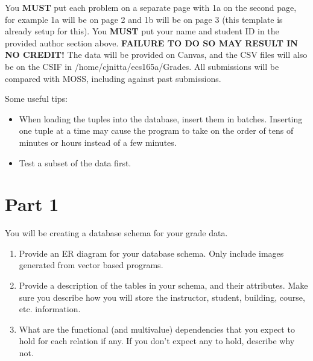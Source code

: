 \documentclass{article}
\begin{document}
You {\bf MUST} put each problem on a separate page with 1a on the second page, for example 1a will be on page 2 and 1b will be on page 3 (this template is already setup for this).
You {\bf MUST} put your name and student ID in the provided author section above. {\bf FAILURE TO DO SO MAY RESULT IN NO CREDIT!}
The data will be provided on Canvas, and the CSV files will also be on the CSIF in /home/cjnitta/ecs165a/Grades. All submissions will be compared with MOSS, including against past submissions.

Some useful tips:
\begin{itemize}
\item When loading the tuples into the database, insert them in batches. Inserting one tuple at a time may cause the program to take on the order of tens of minutes or hours instead of a few minutes.
\item Test a subset of the data first.
\end{itemize}

\clearpage
\section*{Part 1}
You will be creating a database schema for your grade data.

\begin{enumerate}[label=\alph*.]
\item Provide an ER diagram for your database schema. Only include images generated from vector based programs. \\
 \clearpage
\item Provide a description of the tables in your schema, and their attributes. Make sure you describe how you will store the instructor, student, building, course, etc. information. \\
 \clearpage
\item What are the functional (and multivalue) dependencies that you expect to hold for each relation if any. If you don't expect any to hold, describe why not. \\
 \clearpage
\end{enumerate}
\end{document}
